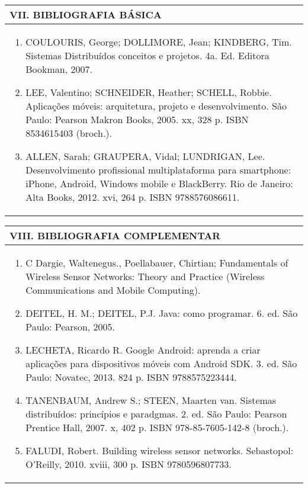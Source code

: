 \documentclass[12pt]{article}
\begin{document}
\newpage


\begin{longtable}{|L{1.025\textwidth}|} \hline
%
{\bf VII. BIBLIOGRAFIA BÁSICA} \\ \hline
\begin{enumerate}
\item COULOURIS, George; DOLLIMORE, Jean; KINDBERG, Tim. Sistemas Distribuídos conceitos e projetos. 4a. Ed. Editora Bookman, 2007. 
\item LEE, Valentino; SCHNEIDER, Heather; SCHELL, Robbie. Aplicações móveis: arquitetura, projeto e desenvolvimento. São Paulo: Pearson Makron Books, 2005. xx, 328 p. ISBN 8534615403 (broch.). 
\item ALLEN, Sarah; GRAUPERA, Vidal; LUNDRIGAN, Lee. Desenvolvimento profissional multiplataforma para smartphone: iPhone, Android, Windows mobile e BlackBerry. Rio de Janeiro: Alta Books, 2012. xvi, 264 p. ISBN 9788576086611.
\end{enumerate}
 \\ \hline
\end{longtable}



\begin{longtable}{|L{1.025\textwidth}|} \hline
%
{\bf VIII. BIBLIOGRAFIA COMPLEMENTAR} \\ \hline
\begin{enumerate}
\item C Dargie, Waltenegus., Poellabauer, Chirtian; Fundamentals of Wireless Sensor Networks: Theory and Practice (Wireless Communications and Mobile Computing). 
\item DEITEL, H. M.; DEITEL, P.J. Java: como programar. 6. ed. São Paulo: Pearson, 2005.
\item LECHETA, Ricardo R. Google Android: aprenda a criar aplicações para dispositivos móveis com Android SDK. 3. ed. São Paulo: Novatec, 2013. 824 p. ISBN 9788575223444.
\item TANENBAUM, Andrew S.; STEEN, Maarten van. Sistemas distribuídos: princípios e paradgmas. 2. ed. São Paulo: Pearson Prentice Hall, 2007. x, 402 p. ISBN 978-85-7605-142-8 (broch.).
\item FALUDI, Robert. Building wireless sensor networks. Sebastopol: O'Reilly, 2010. xviii, 300 p. ISBN 9780596807733.
%
\end{enumerate}
 \\ \hline
\end{longtable}



\end{document}
